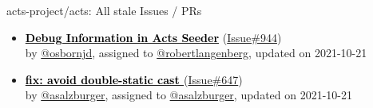 \begin{frame}[allowframebreaks]{ acts-project/acts: All stale Issues / PRs}
\begin{itemize}
    \item\iss\prstale
    \hspace*{0.1em}
    \textbf{\href{https://github.com/acts-project/acts/issues/944}{\textcolor{black}{Debug Information in Acts Seeder}}}
    (\href{https://github.com/acts-project/acts/issues/944}{Issue\#944}) \\
    by \href{https://github.com/osbornjd}{@osbornjd}, {}assigned to \href{https://github.com/robertlangenberg}{@robertlangenberg}, updated on 2021-10-21

    \item\iss\prstale
    \hspace*{0.1em}
    \textbf{\href{https://github.com/acts-project/acts/issues/647}{\textcolor{black}{fix: avoid double-static cast }}}
    (\href{https://github.com/acts-project/acts/issues/647}{Issue\#647}) \\
    by \href{https://github.com/asalzburger}{@asalzburger}, {}assigned to \href{https://github.com/asalzburger}{@asalzburger}, updated on 2021-10-21

  \end{itemize}
\end{frame}
